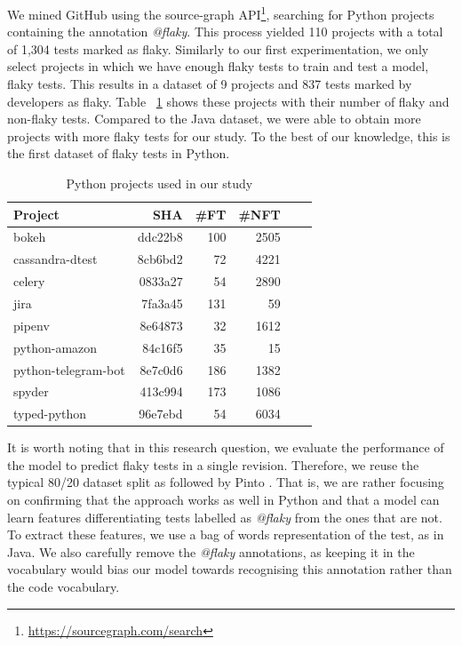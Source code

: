We mined GitHub using the source-graph API\footnote{\url{https://sourcegraph.com/search}}, searching for Python projects containing the annotation \emph{@flaky}. 
This process yielded 110 projects with a total of 1,304 tests marked as flaky. 
Similarly to our first experimentation, we only select projects in which we have enough flaky tests to train and test a model,  flaky tests.
This results in a dataset of 9 projects and 837 tests marked by developers as flaky.
Table ~\ref{pythonInfo} shows these projects with their number of flaky and non-flaky tests. 
Compared to the Java dataset, we were able to obtain more projects with more flaky tests for our study.
To the best of our knowledge, this is the first dataset of flaky tests in Python.

\begin{table}
\centering
\caption{Python projects used in our study}
\label{pythonInfo}
 \begin{tabular}{l|r r r r r} 
 \toprule
 \textbf{Project} & \textbf{SHA} & \textbf{\#FT }& \textbf{\#NFT}\\ [0.25ex]
 \midrule
 bokeh & ddc22b8 & 100 & 2505 \\
 cassandra-dtest & 8cb6bd2 & 72 & 4221 \\
 celery & 0833a27 & 54 & 2890 \\
 jira & 7fa3a45 & 131 & 59 \\
 pipenv & 8e64873 & 32 & 1612 \\
 python-amazon & 84c16f5 & 35 & 15 \\
 python-telegram-bot & 8e7c0d6 & 186 & 1382 \\
 spyder & 413c994 & 173 & 1086 \\
 typed-python & 96e7ebd & 54 & 6034 \\ 
 \bottomrule
\end{tabular}
\end{table}

It is worth noting that in this research question, we evaluate the performance of the model to predict flaky tests in a single revision. Therefore, we reuse the typical 80/20 dataset split as followed by Pinto \etal.  
That is, we are rather focusing on confirming that the approach works as well in Python and that a model can learn features differentiating tests labelled as \emph{@flaky} from the ones that are not. 
To extract these features, we use a bag of words representation of the test, as in Java. 
We also carefully remove the \emph{@flaky} annotations, as keeping it in the vocabulary would bias our model towards recognising this annotation rather than the code vocabulary.


